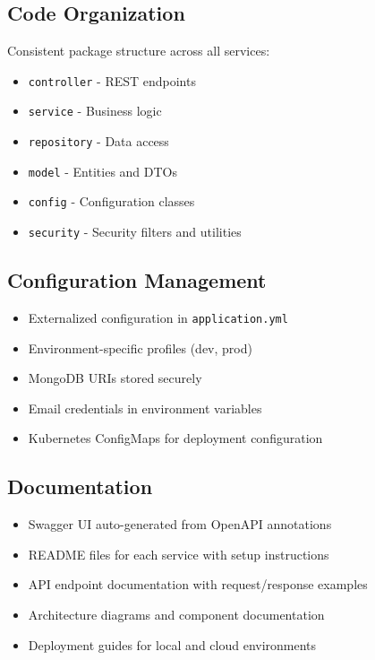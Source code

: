 \subsection{Code Organization}

Consistent package structure across all services:
\begin{itemize}
    \item \texttt{controller} - REST endpoints
    \item \texttt{service} - Business logic
    \item \texttt{repository} - Data access
    \item \texttt{model} - Entities and DTOs
    \item \texttt{config} - Configuration classes
    \item \texttt{security} - Security filters and utilities
\end{itemize}

\subsection{Configuration Management}

\begin{itemize}
    \item Externalized configuration in \texttt{application.yml}
    \item Environment-specific profiles (dev, prod)
    \item MongoDB URIs stored securely
    \item Email credentials in environment variables
    \item Kubernetes ConfigMaps for deployment configuration
\end{itemize}

\subsection{Documentation}

\begin{itemize}
    \item Swagger UI auto-generated from OpenAPI annotations
    \item README files for each service with setup instructions
    \item API endpoint documentation with request/response examples
    \item Architecture diagrams and component documentation
    \item Deployment guides for local and cloud environments
\end{itemize}

